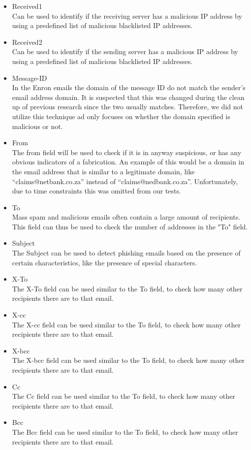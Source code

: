 \documentclass[hidelinks,english]{article}
\begin{document}
        \begin{itemize}
					\item Received1\\
							Can be used to identify if the receiving server has a malicious IP address by using a predefined list of malicious blacklisted IP addresses.
					\item Received2\\
							Can be used to identify if the sending server has a malicious IP address by using a predefined list of malicious blacklisted IP addresses.
					\item Message-ID\\
							In the Enron emails the domain of the message ID do not match the sender's email address domain. It is suspected that this was changed during the clean up of previous research since the two usually matches. Therefore, we did not utilize this technique ad only focuses on whether the domain specified is malicious or not.
					\item From\\
							The from field will be used to check if it is in anyway suspicious, or has any obvious indicators of a fabrication. An example of this would be a domain in the email address that is similar to a legitimate domain, like ``claims@netbank.co.za'' instead of ``claims@nedbank.co.za''. Unfortunately, due to time constraints this was omitted from our tests.
					\item To\\
							Mass spam and malicious emails often contain a large amount of recipients. This field can thus be used to check the number of addresses in the "To" field.
					\item Subject\\
						The Subject can be used to detect phishing emails based on the presence of certain characteristics, like the presence of special characters. 
					\item X-To\\
						The X-To field can be used similar to the To field, to check how many other recipients there are to that email.
					\item X-cc\\
						The X-cc field can be used similar to the To field, to check how many other recipients there are to that email.
					\item X-bcc\\
						The X-bcc field can be used similar to the To field, to check how many other recipients there are to that email.
					\item Cc\\
							The Cc field can be used similar to the To field, to check how many other recipients there are to that email.
					\item Bcc\\
							The Bcc field can be used similar to the To field, to check how many other recipients there are to that email.
				\end{itemize}
		
\end{document}
